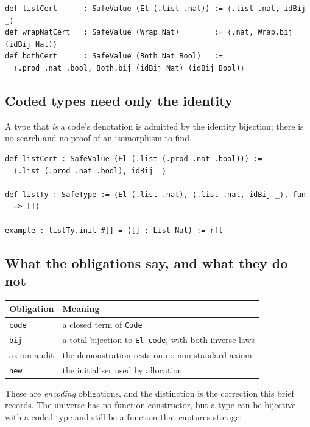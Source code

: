 \documentclass[10pt,a4paper]{article}
\newcommand{\file}[1]{\texttt{\small #1}}
\begin{document}
\begin{lstlisting}[style=out]
def listCert      : SafeValue (El (.list .nat)) := ⟨.list .nat, idBij _⟩
def wrapNatCert   : SafeValue (Wrap Nat)        := ⟨.nat, Wrap.bij (idBij Nat)⟩
def bothCert      : SafeValue (Both Nat Bool)   :=
  ⟨.prod .nat .bool, Both.bij (idBij Nat) (idBij Bool)⟩
\end{lstlisting}

\subsection*{Coded types need only the identity}

A type that \emph{is} a code's denotation is admitted by the identity bijection;
there is no search and no proof of an isomorphism to find.

\begin{lstlisting}[caption={\file{bench/UniverseDemo.lean}.}]
def listCert : SafeValue (El (.list (.prod .nat .bool))) :=
  ⟨.list (.prod .nat .bool), idBij _⟩

def listTy : SafeType := ⟨El (.list .nat), ⟨.list .nat, idBij _⟩, fun _ => []⟩

example : listTy.init #[] = ([] : List Nat) := rfl
\end{lstlisting}

\subsection*{What the obligations say, and what they do not}

\begin{center}
\begin{tabular}{@{}ll@{}}
\toprule
Obligation & Meaning \\
\midrule
\texttt{code} & a closed term of \texttt{Code} \\
\texttt{bij} & a total bijection to \texttt{El code}, with both inverse laws \\
axiom audit & the demonstration rests on no non-standard axiom \\
\texttt{new} & the initialiser used by allocation \\
\bottomrule
\end{tabular}
\end{center}

These are \emph{encoding} obligations, and the distinction is the correction
this brief records. The universe has no function constructor, but a type can be
bijective with a coded type and still be a function that captures storage:
\end{document}
